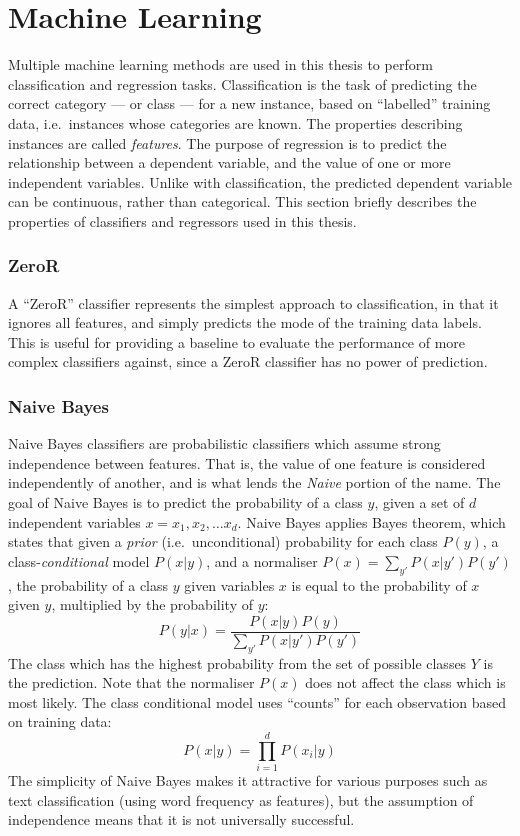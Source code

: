\section{Machine Learning}


Multiple machine learning methods are used in this thesis to perform
classification and regression tasks. Classification is the task of
predicting the correct category --- or class --- for a new instance,
based on ``labelled'' training data, i.e.\ instances whose categories
are known. The properties describing instances are called
\emph{features}. The purpose of regression is to predict the
relationship between a dependent variable, and the value of one or
more independent variables. Unlike with classification, the predicted
dependent variable can be continuous, rather than categorical. This
section briefly describes the properties of classifiers and regressors
used in this thesis.


\subsubsection{ZeroR}

A ``ZeroR'' classifier represents the simplest approach to
classification, in that it ignores all features, and simply predicts
the mode of the training data labels. This is useful for providing a
baseline to evaluate the performance of more complex classifiers
against, since a ZeroR classifier has no power of prediction.


\subsubsection{Naive Bayes}

Naive Bayes classifiers are probabilistic classifiers which assume
strong independence between features. That is, the value of one
feature is considered independently of another, and is what lends the
\emph{Naive} portion of the name. The goal of Naive Bayes is to
predict the probability of a class $y$, given a set of $d$ independent
variables $x = x_1, x_2, \ldots x_d$. Naive Bayes applies Bayes
theorem, which states that given a \emph{prior} (i.e.\ unconditional)
probability for each class $P(y)$, a class-\emph{conditional} model
$P(x|y)$, and a normaliser $P(x) = \sum_{y'}P(x|y')P(y')$, the
probability of a class $y$ given variables $x$ is equal to the
probability of $x$ given $y$, multiplied by the probability of $y$:
%
\begin{equation}
  P(y|x) = \frac{P(x|y)P(y)}{\sum_{y'}P(x|y')P(y')}
\end{equation}
%
The class which has the highest probability from the set of possible
classes $Y$ is the prediction. Note that the normaliser $P(x)$ does
not affect the class which is most likely. The class conditional model
uses ``counts'' for each observation based on training data:
%
\begin{equation}
  P(x|y) = \prod_{i=1}^{d} P(x_i|y)
\end{equation}
%
The simplicity of Naive Bayes makes it attractive for various purposes
such as text classification (using word frequency as features), but
the assumption of independence means that it is not universally
successful.


